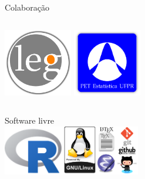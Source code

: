 \begin{frame}
  \frametitle{}
  \framesubtitle{}

  \begin{center}
    Colaboração
  \end{center}
  \begin{columns}[t]
    \hfill\includegraphics[width=3cm]{./images/leg.png}
    \hfill
    \includegraphics[width=3cm]{./images/pet.png}\hfill
  \end{columns}
  
\begin{center}
  Software livre\\ \vspace{1em}
  \includegraphics[width=6cm]{./images/logos.png}
\end{center}

\end{frame}
